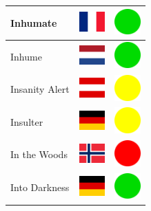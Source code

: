 \documentclass[12pt, a4paper, twoside]{report}
\begin{document}
\begin{center}
\begin{longtable}{|p{5cm}|p{2cm}|p{2cm}|}
 Inhumate                                                   & \includegraphics[width=1cm]{../4x3/fr} &   \includegraphics[width=1cm]{../likes/y} \\ \hline
 Inhume                                                     & \includegraphics[width=1cm]{../4x3/nl} &   \includegraphics[width=1cm]{../likes/y} \\ \hline
 Insanity Alert                                             & \includegraphics[width=1cm]{../4x3/at} &   \includegraphics[width=1cm]{../likes/m} \\ \hline
 Insulter                                                   & \includegraphics[width=1cm]{../4x3/de} &   \includegraphics[width=1cm]{../likes/m} \\ \hline
 In the Woods                                               & \includegraphics[width=1cm]{../4x3/no} &   \includegraphics[width=1cm]{../likes/n} \\ \hline
 Into Darkness                                              & \includegraphics[width=1cm]{../4x3/de} &   \includegraphics[width=1cm]{../likes/y} \\ \hline

\end{longtable}
\end{center}
\end{document}
